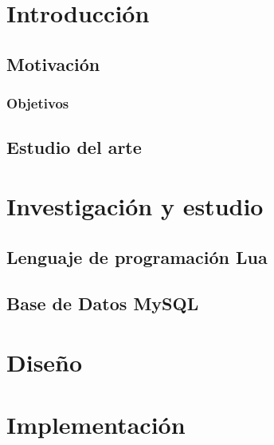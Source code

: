 \chapter{Introducción}

    \section{Motivación}

        \subsection{Objetivos}

        \newpage


    \section{Estudio del arte}

\cleardoublepage



\chapter{Investigación y estudio}

    \section{Lenguaje de programación Lua}



    \section{Base de Datos MySQL}

\cleardoublepage



\chapter{Diseño}

\cleardoublepage



\chapter{Implementación}

